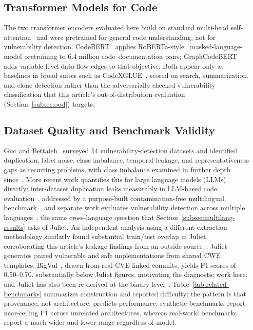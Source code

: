 \documentclass{ieeeaccess}
\begin{document}
\subsection{Transformer Models for Code}
\label{subsec:bg-transformers}
The two transformer encoders evaluated here build on standard multi-head self-attention~\cite{ref15} and were pretrained for general code understanding, not for vulnerability detection. CodeBERT~\cite{ref7} applies RoBERTa-style~\cite{ref16} masked-language-model pretraining to 6.4 million code--documentation pairs; GraphCodeBERT~\cite{ref8} adds variable-level data-flow edges to that objective. Both appear only as baselines in broad suites such as CodeXGLUE~\cite{ref17}, scored on search, summarization, and clone detection rather than the adversarially checked vulnerability classification that this article's out-of-distribution evaluation (Section~\ref{subsec:ood}) targets.

\subsection{Dataset Quality and Benchmark Validity}
\label{subsec:bg-quality}
Guo and Bettaieb~\cite{ref10} surveyed 54 vulnerability-detection datasets and identified duplication, label noise, class imbalance, temporal leakage, and representativeness gaps as recurring problems, with class imbalance examined in further depth since~\cite{ref18}. More recent work quantifies this for large language models (LLMs) directly: inter-dataset duplication leaks measurably in LLM-based code evaluation~\cite{ref19}, addressed by a purpose-built contamination-free multilingual benchmark~\cite{ref20}, and separate work evaluates vulnerability detection across multiple languages~\cite{ref21}, the same cross-language question that Section~\ref{subsec:multilang-results} asks of Juliet. An independent analysis using a different extraction methodology similarly found substantial train/test overlap in Juliet, corroborating this article's leakage findings from an outside source~\cite{ref22}. Juliet~\cite{ref11} generates paired vulnerable and safe implementations from shared CWE templates. BigVul~\cite{ref23}, drawn from real CVE-linked commits, yields F1 scores of 0.50--0.70, substantially below Juliet figures, motivating the diagnostic work here, and Juliet has also been re-derived at the binary level~\cite{ref24}. Table~\ref{tab:related-benchmarks} summarizes construction and reported difficulty; the pattern is that provenance, not architecture, predicts performance: synthetic benchmarks report near-ceiling F1 across unrelated architectures, whereas real-world benchmarks report a much wider and lower range regardless of model.
\end{document}

